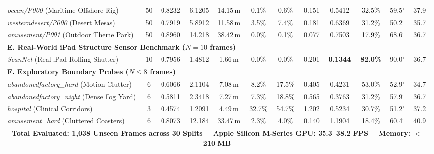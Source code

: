 \begin{table}[t]
{\begin{tabular}{l c cccccc ccc c}
\textit{ocean/P000} (Maritime Offshore Rig) & 50 & 0.8232 & 6.1205 & 14.15\,m & 0.1\% & 0.6\% & 0.151 & 0.5412 & 32.5\% & 59.5$^\circ$ & 37.9 \\
\textit{westerndesert/P000} (Desert Mesas) & 50 & 0.7919 & 5.8912 & 11.58\,m & 3.5\% & 7.4\% & 0.181 & 0.6369 & 31.2\% & 50.2$^\circ$ & 35.7 \\
\textit{amusement/P001} (Outdoor Theme Park) & 50 & 0.8960 & 14.218 & 38.42\,m & 0.0\% & 0.1\% & 0.077 & 0.7503 & 17.9\% & 68.6$^\circ$ & 36.7 \\
\midrule
\multicolumn{12}{l}{\textbf{E. Real-World iPad Structure Sensor Benchmark ($N=10$ frames)}} \\
\textit{ScanNet} (Real iPad Rolling-Shutter) & 10 & 0.7956 & 1.4812 & 1.66\,m & 0.0\% & 0.0\% & 0.201 & \textbf{0.1344} & \textbf{82.0\%} & 90.0$^\circ$ & 36.7 \\
\midrule
\multicolumn{12}{l}{\textbf{F. Exploratory Boundary Probes ($N \le 8$ frames)}} \\
\textit{abandonedfactory\_hard} (Motion Clutter) & 6 & 0.6066 & 2.1104 & 7.08\,m & 8.2\% & 17.5\% & 0.405 & 0.4231 & 53.0\% & 52.9$^\circ$ & 34.7 \\
\textit{abandonedfactory\_night} (Dense Fog Yard) & 6 & 0.5811 & 2.3418 & 7.27\,m & 7.3\% & 18.8\% & 0.565 & 0.3763 & 31.2\% & 57.9$^\circ$ & 36.7 \\
\textit{hospital} (Clinical Corridors) & 3 & 0.4574 & 1.2091 & 4.49\,m & 32.7\% & 54.7\% & 1.202 & 0.5234 & 30.7\% & 51.2$^\circ$ & 37.2 \\
\textit{amusement\_hard} (Cluttered Coasters) & 6 & 0.8073 & 12.184 & 33.47\,m & 2.3\% & 4.0\% & 0.140 & 1.1904 & 18.4\% & 60.4$^\circ$ & 40.9 \\
\midrule
\multicolumn{12}{c}{\textbf{Total Evaluated: 1{,}038 Unseen Frames across 30 Splits \quad---\quad Apple Silicon M-Series GPU: 35.3--38.2 FPS \quad---\quad Memory: $<$210 MB}} \\
\bottomrule
\end{tabular}%
}
\end{table}

